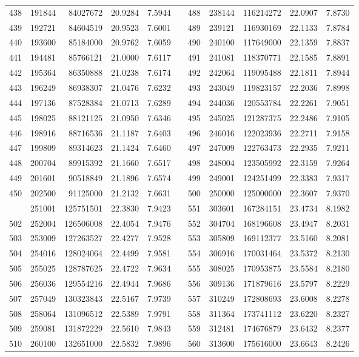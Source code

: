 \begin{longtable}{rrrrrrrrrrr}
438&191844&84027672&20.9284&7.5944&&488&238144&116214272&22.0907&7.8730\\
439&192721&84604519&20.9523&7.6001&&489&239121&116930169&22.1133&7.8784\\
440&193600&85184000&20.9762&7.6059&&490&240100&117649000&22.1359&7.8837\\
441&194481&85766121&21.0000&7.6117&&491&241081&118370771&22.1585&7.8891\\
442&195364&86350888&21.0238&7.6174&&492&242064&119095488&22.1811&7.8944\\
443&196249&86938307&21.0476&7.6232&&493&243049&119823157&22.2036&7.8998\\
444&197136&87528384&21.0713&7.6289&&494&244036&120553784&22.2261&7.9051\\
445&198025&88121125&21.0950&7.6346&&495&245025&121287375&22.2486&7.9105\\
446&198916&88716536&21.1187&7.6403&&496&246016&122023936&22.2711&7.9158\\
447&199809&89314623&21.1424&7.6460&&497&247009&122763473&22.2935&7.9211\\
448&200704&89915392&21.1660&7.6517&&498&248004&123505992&22.3159&7.9264\\
449&201601&90518849&21.1896&7.6574&&499&249001&124251499&22.3383&7.9317\\
450&202500&91125000&21.2132&7.6631&&500&250000&125000000&22.3607&7.9370\\
\newpage
501&251001&125751501&22.3830&7.9423&&551&303601&167284151&23.4734&8.1982\\
502&252004&126506008&22.4054&7.9476&&552&304704&168196608&23.4947&8.2031\\
503&253009&127263527&22.4277&7.9528&&553&305809&169112377&23.5160&8.2081\\
504&254016&128024064&22.4499&7.9581&&554&306916&170031464&23.5372&8.2130\\
505&255025&128787625&22.4722&7.9634&&555&308025&170953875&23.5584&8.2180\\
506&256036&129554216&22.4944&7.9686&&556&309136&171879616&23.5797&8.2229\\
507&257049&130323843&22.5167&7.9739&&557&310249&172808693&23.6008&8.2278\\
508&258064&131096512&22.5389&7.9791&&558&311364&173741112&23.6220&8.2327\\
509&259081&131872229&22.5610&7.9843&&559&312481&174676879&23.6432&8.2377\\
510&260100&132651000&22.5832&7.9896&&560&313600&175616000&23.6643&8.2426\\

\end{longtable}
